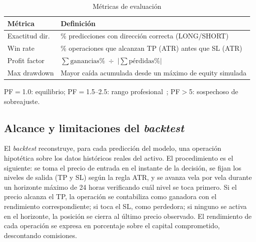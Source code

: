 \documentclass[10pt,twocolumn]{article}
\begin{document}
\begin{table}[H]
\centering
\caption{M\'etricas de evaluaci\'on}
\label{tab:metrics}
\footnotesize
\begin{tabularx}{\columnwidth}{lX}
\toprule
\textbf{M\'etrica} & \textbf{Definici\'on} \\
\midrule
Exactitud dir. & \% predicciones con direcci\'on correcta (LONG/SHORT) \\
Win rate & \% operaciones que alcanzan TP (ATR) antes que SL (ATR) \\
Profit factor & $\sum \text{ganancias\%} \;\div\; |\sum \text{p\'erdidas\%}|$ \\
Max drawdown & Mayor ca\'ida acumulada desde un m\'aximo de equity simulada \\
\bottomrule
\end{tabularx}
{\scriptsize PF$=$1.0: equilibrio; PF$=$1.5--2.5: rango profesional~\cite{pardo2008}; PF$>$5: sospechoso de sobreajuste.}
\end{table}

\subsection{Alcance y limitaciones del \textit{backtest}}

El \textit{backtest} reconstruye, para cada predicci\'on del modelo, una operaci\'on hipot\'etica sobre los datos hist\'oricos reales del activo. El procedimiento es el siguiente: se toma el precio de entrada en el instante de la decisi\'on, se fijan los niveles de salida (TP y SL) seg\'un la regla ATR, y se avanza vela por vela durante un horizonte m\'aximo de 24 horas verificando cu\'al nivel se toca primero. Si el precio alcanza el TP, la operaci\'on se contabiliza como ganadora con el rendimiento correspondiente; si toca el SL, como perdedora; si ninguno se activa en el horizonte, la posici\'on se cierra al \'ultimo precio observado. El rendimiento de cada operaci\'on se expresa en porcentaje sobre el capital comprometido, descontando comisiones.
\end{document}
